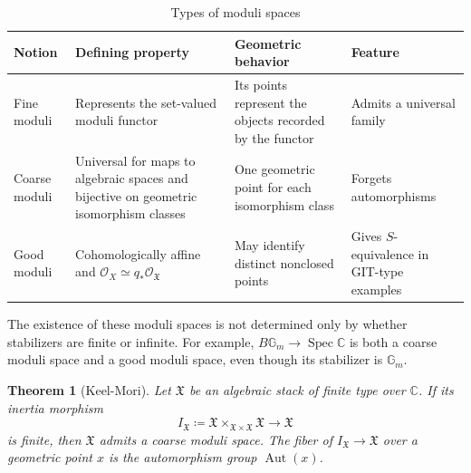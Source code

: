 \documentclass{amsart}
\newtheorem{thm}{Theorem}[section]
\theoremstyle{definition}
\theoremstyle{remark}
\theoremstyle{plain}
\theoremstyle{definition}
\theoremstyle{remark}
\newcommand{\G}{\mathbb{G}}
\newcommand{\C}{\mathbb{C}}
\newcommand{\mc}[1]{\mathcal{#1}}
\newcommand{\mf}[1]{\mathfrak{#1}}
\newcommand{\on}[1]{\operatorname{#1}}
\newcommand{\1}{\mathbf{1}}
\newcommand{\2}{\mathbf{2}}
\newcommand{\3}{\mathbf{3}}
\begin{document}
\begin{table}[htpb]
    \centering
    \caption{Types of moduli spaces}
    \label{tab:moduli-types-corrected}
    \renewcommand{\arraystretch}{1.3}
    \begin{tabular}{
        p{}
        p{}
        p{}
        p{}
    }
        \toprule
        \textbf{Notion}
        & \textbf{Defining property}
        & \textbf{Geometric behavior}
        & \textbf{Feature}
        \\
        \midrule
        Fine moduli
        & Represents the set-valued moduli functor
        & Its points represent the objects recorded by the functor
        & Admits a universal family
        \\
        Coarse moduli
        & Universal for maps to algebraic spaces and bijective on geometric isomorphism classes
        & One geometric point for each isomorphism class
        & Forgets automorphisms
        \\
        Good moduli
        & Cohomologically affine and
          \(\mc{O}_X \simeq q_*\mc{O}_{\mf{X}}\)
        & May identify distinct nonclosed points
        & Gives \(S\)-equivalence in GIT-type examples
        \\
        \bottomrule
    \end{tabular}
\end{table}

The existence of these moduli spaces is not determined only by whether stabilizers are finite or infinite. For example, \(B\G_m\to\on{Spec}\C\) is both a coarse moduli space and a good moduli space, even though its stabilizer is \(\G_m\).

\begin{thm}[Keel-Mori]
    Let \(\mf{X}\) be an algebraic stack of finite type over \(\C\). If its inertia morphism
    \[
        I_{\mf{X}}
        \coloneqq
        \mf{X}\times_{\mf{X}\times\mf{X}}\mf{X}
        \longrightarrow \mf{X}
    \]
    is finite, then \(\mf{X}\) admits a coarse moduli space. The fiber of \(I_{\mf{X}}\to\mf{X}\) over a geometric point \(x\) is the automorphism group \(\on{Aut}(x)\).
\end{thm}
\end{document}

